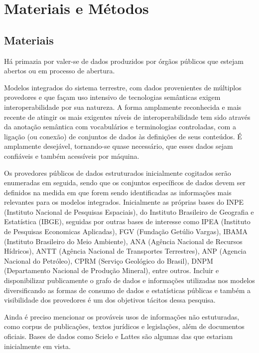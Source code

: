 \documentclass[
	12pt,				%
	openany,			%
	oneside,			%
	a4paper,			%
	english,			%
	french,				%
	spanish,			%
	brazil,				%
	]{abntex2}
\begin{document}
\chapter{Materiais e Métodos}

\section{Materiais}

Há primazia por valer-se de dados produzidos por órgãos públicos que estejam abertos ou em processo de abertura.

Modelos integrados do sistema terrestre, com dados provenientes de múltiplos provedores e que façam uso intensivo de tecnologias semânticas exigem interoperabilidade por sua natureza. A forma amplamente reconhecida e mais recente de atingir os mais exigentes níveis de interoperabilidade tem sido através da anotação semântica com vocabulários e terminologias controladas, com a ligação (ou conexão) de conjuntos de dados às definições de seus conteúdos. É amplamente desejável, tornando-se quase necessário, que esses dados sejam confiáveis e também acessíveis por máquina.

Os provedores públicos de dados estruturados inicialmente cogitados serão enumeradas em seguida, sendo que os conjuntos específicos de dados devem ser definidos na medida em que forem sendo identificadas as informações mais relevantes para os modelos integrados. Inicialmente as próprias bases do INPE (Instituto Nacional de Pesquisas Espaciais), do Instituto Brasileiro de Geografia e Estatística (IBGE), seguidas por outras bases de interesse como IPEA (Instituto de Pesquisas Economicas Aplicadas), FGV (Fundação Getúlio Vargas), IBAMA (Instituto Brasileiro do Meio Ambiente), ANA (Agência Nacional de Recursos Hídricos), ANTT (Agência Nacional de Transportes Terrestres), ANP (Agencia Nacional do Petróleo), CPRM (Serviço Geológico do Brasil), DNPM (Departamento Nacional de Produção Mineral), entre outros. Incluir e disponibilizar publicamente o grafo de dados e informações utilizadas nos modelos diversificando as formas de consumo de dados e estatísticas públicas e também a visibilidade dos provedores é um dos objetivos tácitos dessa pesquisa.

Ainda é preciso mencionar os prováveis usos de informações não estuturadas, como corpus de publicações, textos jurídicos e legislações, além de documentos oficiais. Bases de dados como Scielo e Lattes são algumas das que estariam inicialmente em vista.
\end{document}
